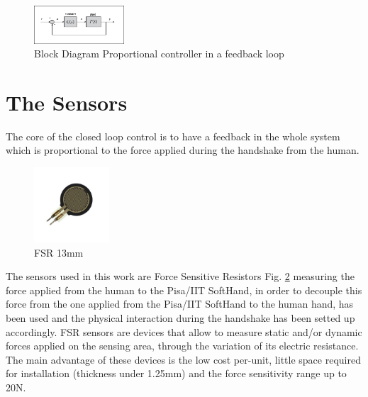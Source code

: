 \begin{figure}[h]
\centering
\includegraphics[width=0.3\textwidth]{Figure/feedbackP.png}
\caption{Block Diagram Proportional controller in a feedback loop}
\label{Fig:Pr}
\end{figure}


\section{The Sensors}
The core of the closed loop control is to have a feedback in the whole system which is proportional to the force applied during the handshake from the human. 
\begin{figure}
\centering
\includegraphics[width=0.25\textwidth]{Figure/fsrsingle1.jpg}
\caption{FSR 13mm}
\label{Fig:FSRsingle}
\end{figure}

The sensors used in this work are Force Sensitive Resistors Fig. \ref{Fig:FSRsingle} measuring the force applied from the human to the Pisa/IIT SoftHand, in order to decouple this force from the one applied from the Pisa/IIT SoftHand to the human hand, \cite{espen} has been used and the physical interaction during the handshake has been setted up accordingly.
FSR sensors are devices that allow to measure static and/or dynamic forces applied on the sensing area, through the variation of its electric resistance. The main advantage of these devices is the low cost per-unit, little space required for installation (thickness under 1.25mm) and the force sensitivity range up to 20N.\\


